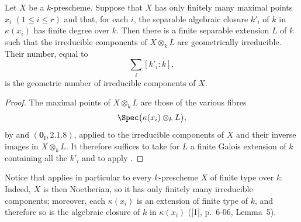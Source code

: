 \begin{corollary}[4.5.11]
\label{IV.4.5.11}
Let $X$ be a $k$-prescheme.
Suppose that $X$ has only finitely many maximal points
$x_i$ $(1\leq i\leq r)$ and that, for each $i$, the separable
algebraic closure $k'_i$ of $k$ in $\kappa(x_i)$ has finite degree
over $k$.
Then there is a finite separable extension $L$ of $k$ such that the
irreducible components of $X\otimes_k L$ are geometrically
irreducible.
Their number, equal to
\[
\sum_i[k'_i:k],
\]
is the geometric number of irreducible components of $X$.
\end{corollary}

\begin{proof}
The maximal points of $X\otimes_k L$ are those of the various fibres
\[
\Spec\bigl(\kappa(x_i)\otimes_k L\bigr),
\]
by  and $(\mathbf{0}_{\mathrm I},2.1.8)$, applied to
the irreducible components of $X$ and their inverse images in
$X\otimes_k L$.
It therefore suffices to take for $L$ a finite Galois extension of
$k$ containing all the $k'_i$ and to apply .
\end{proof}

Notice that  applies in particular to every
$k$-prescheme $X$ of finite type over $k$.
Indeed, $X$ is then Noetherian, so it has only finitely many
irreducible components; moreover, each $\kappa(x_i)$ is an extension
of finite type of $k$, and therefore so is the algebraic closure of
$k$ in $\kappa(x_i)$ ([1], p.~6-06, Lemma~5).

